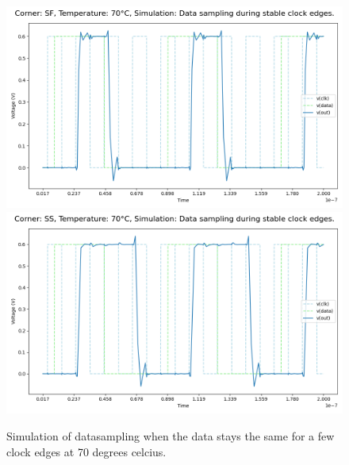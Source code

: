 \begin{figure}[H]
    \vspace{5pt}
    \includegraphics[height= 0.21\textheight]{figures/aimspice/SF/70/W3.csv.png}
    \vspace{5pt}
    \includegraphics[height= 0.21\textheight]{figures/aimspice/SS/70/W3.csv.png}
    \caption{Simulation of datasampling when the data stays the same for a few clock edges at 70 degrees celcius.}
    \label{fig:aimspice_W3_70}
\end{figure}

\pagebreak

